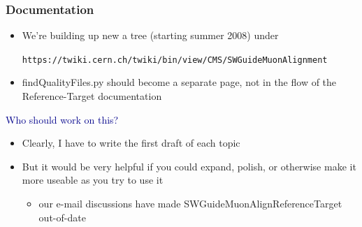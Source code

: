 \documentclass[compress]{beamer}
\begin{document}
\begin{frame}
\frametitle{Documentation}
\begin{itemize}
\item We're building up new a tree (starting summer 2008) under

{\tt \scriptsize https://twiki.cern.ch/twiki/bin/view/CMS/SWGuideMuonAlignment}

\item findQualityFiles.py should become a separate page, not in the flow of the Reference-Target documentation
\end{itemize}

\vfill
\hspace{-0.83 cm} \textcolor{darkblue}{\Large Who should work on this?}
\begin{itemize}
\item Clearly, I have to write the first draft of each topic

\item But it would be very helpful if you could expand, polish, or
  otherwise make it more useable as you try to use it
\begin{itemize}
\item our e-mail discussions have made SWGuideMuonAlignReferenceTarget out-of-date
\end{itemize}
\end{itemize}
\end{frame}
\end{document}
